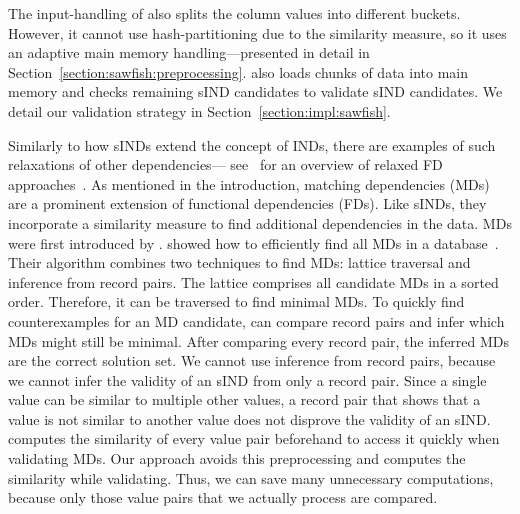 The input-handling of \sawfish also splits the column values into different buckets.
However, it cannot use hash-partitioning due to the similarity measure, so it uses an adaptive main memory handling---presented in detail in Section~\ref{section:sawfish:preprocessing}.
\sawfish also loads chunks of data into main memory and checks remaining sIND candidates to validate sIND candidates.
We detail our validation strategy in Section~\ref{section:impl:sawfish}.

Similarly to how sINDs extend the concept of INDs, there are examples of such relaxations of other dependencies--- see~\citeauthor{caruccio2016relaxed} for an overview of relaxed FD approaches~\cite{caruccio2016relaxed}.
As mentioned in the introduction, matching dependencies (MDs) are a prominent extension of functional dependencies (FDs).
Like sINDs, they incorporate a similarity measure to find additional dependencies in the data.
MDs were first introduced by \textcite{fan2008dependencies}.
\citeauthor{MDDiscovery} showed how to efficiently find all MDs in a database~\cite{MDDiscovery}.
Their  algorithm combines two techniques to find MDs: lattice traversal and inference from record pairs.
The lattice comprises all candidate MDs in a sorted order.
Therefore, it can be traversed to find minimal MDs.
To quickly find counterexamples for an MD candidate,  can compare record pairs and infer which MDs might still be minimal.
After comparing every record pair, the inferred MDs are the correct solution set.
We cannot use inference from record pairs, because we cannot infer the validity of an sIND from only a record pair.
Since a single value can be similar to multiple other values, a record pair that shows that a value is not similar to another value does not disprove the validity of an sIND.
 computes the similarity of every value pair beforehand to access it quickly when validating MDs.
Our approach avoids this preprocessing and computes the similarity while validating.
Thus, we can save many unnecessary computations, because only those value pairs that we actually process are compared.

